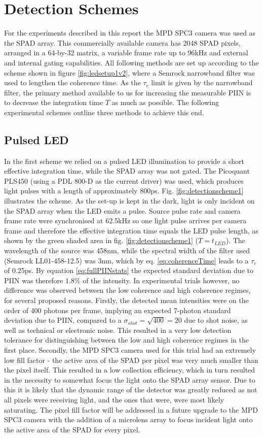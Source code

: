 \documentclass[]{article}
\begin{document}
\section{Detection Schemes}
	For the experiments described in this report the MPD SPC3 camera was used as the SPAD array. This commercially available camera has 2048 SPAD pixels, arranged in a 64-by-32 matrix, a variable frame rate up to 96kHz and external and internal gating capabilities. All following methods are set up according to the scheme shown in figure \ref{fig:ledsetup1v2}, where a Semrock narrowband filter was used to lengthen the coherence time. As the $\tau_c$ limit is given by the narrowband filter, the primary method available to us for increasing the measurable PIIN is to decrease the integration time $T$ as much as possible. The following experimental schemes outline three methods to achieve this end.
	
\subsection{Pulsed LED}\label{scheme1}
	In the first scheme we relied on a pulsed LED illumination to provide a short effective integration time, while the SPAD array was not gated. The Picoquant PLS450 (using a PDL 800-D as the current driver) was used, which produces light pulses with a length of approximately 800ps. Fig. \ref{fig:detectionscheme1} illustrates the scheme. As the set-up is kept in the dark, light is only incident on the SPAD array when the LED emits a pulse. Source pulse rate and camera frame rate were synchronised at 62.5kHz so one light pulse arrives per camera frame and therefore the effective integration time equals the LED pulse length, as shown by the green shaded area in fig. \ref{fig:detectionscheme1} ($T = t_{LED}$). The wavelength of the source was 458nm, while the spectral width of the filter used (Semrock LL01-458-12.5) was 3nm, which by eq. \ref{eq:coherenceTime} leads to a $\tau_c$ of 0.25ps. By equation \ref{eq:fullPIINstats} the expected standard deviation due to PIIN was therefore $1.8\%$ of the intensity. In experimental trials however, no difference was observed between the low coherence and high coherence regimes, for several proposed reasons. Firstly, the detected mean intensities were on the order of 400 photons per frame, implying an expected 7-photon standard deviation due to PIIN, compared to a $\sigma_{shot} = \sqrt{400}=20$ due to shot noise, as well as technical or electronic noise. This resulted in a very low detection tolerance for distinguishing between the low and high coherence regimes in the first place. Secondly, the MPD SPC3 camera used for this trial had an extremely low fill factor - the active area of the SPAD per pixel was very much smaller than the pixel itself. This resulted in a low collection efficiency, which in turn resulted in the necessity to somewhat focus the light onto the SPAD array sensor. Due to this it is likely that the dynamic range of the detector was greatly reduced as not all pixels were receiving light, and the ones that were, were most likely saturating. The pixel fill factor will be addressed in a future upgrade to the MPD SPC3 camera with the addition of a microlens array to focus incident light onto the active area of the SPAD for every pixel.
	
\end{document}
